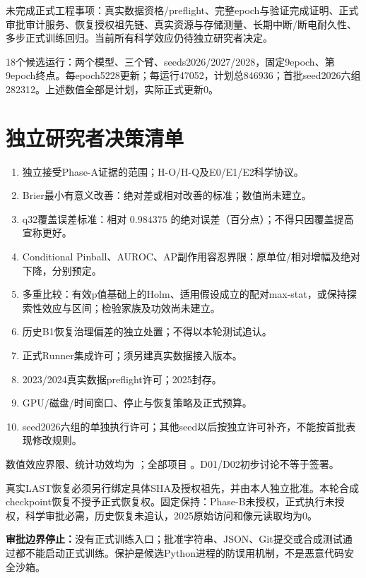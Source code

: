 \documentclass[UTF8,11pt,a4paper]{ctexart}
\begin{document}
未完成正式工程事项：真实数据资格/preflight、完整epoch与验证完成证明、正式审批审计服务、恢复授权祖先链、真实资源与存储测量、长期中断/断电耐久性、多步正式训练回归。当前所有科学效应仍待独立研究者决定。

18个候选运行：两个模型、三个臂、seeds2026/2027/2028，固定9epoch、第9epoch终点。每epoch5228更新；每运行47052，计划总846936；首批seed2026六组282312。上述数值全部是计划，实际正式更新0。
\newpage
\section*{独立研究者决策清单}
\begin{enumerate}
\item 独立接受Phase-A证据的范围；H-O/H-Q及E0/E1/E2科学协议。
\item Brier最小有意义改善：绝对差或相对改善的标准；数值尚未建立。
\item q32覆盖误差标准：相对 $0.984375$ 的绝对误差（百分点）；不得只因覆盖提高宣称更好。
\item Conditional Pinball、AUROC、AP副作用容忍界限：原单位/相对增幅及绝对下降，分别预定。
\item 多重比较：有效p值基础上的Holm、适用假设成立的配对max-stat，或保持探索性效应与区间；检验家族及功效尚未建立。
\item 历史B1恢复治理偏差的独立处置；不得以本轮测试追认。
\item 正式Runner集成许可；须另建真实数据接入版本。
\item 2023/2024真实数据preflight许可；2025封存。
\item GPU/磁盘/时间窗口、停止与恢复策略及正式预算。
\item seed2026六组的单独执行许可；其他seed以后按独立许可补齐，不能按首批表现修改规则。
\end{enumerate}
数值效应界限、统计功效均为 ；全部项目 。D01/D02初步讨论不等于签署。

真实LAST恢复必须另行绑定具体SHA及授权祖先，并由本人独立批准。本轮合成checkpoint恢复不授予正式恢复权。固定保持：Phase-B未授权，正式执行未授权，科学审批必需，历史恢复未追认，2025原始访问和像元读取均为0。

\textbf{审批边界停止：}没有正式训练入口；批准字符串、JSON、Git提交或合成测试通过都不能启动正式训练。保护是候选Python进程的防误用机制，不是恶意代码安全沙箱。
\end{document}
